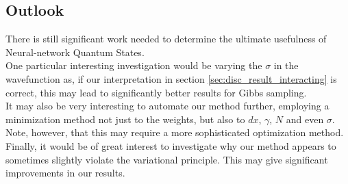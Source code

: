 \documentclass[a4paper, 10pt]{article}
\begin{document}
\subsection{Outlook}
There is still significant work needed to determine the ultimate usefulness of Neural-network Quantum States.\\
\linebreak
One particular interesting investigation would be varying the $\sigma$ in the wavefunction as, if our interpretation in section \ref{sec:disc_result_interacting} is correct, this may lead to significantly better results for Gibbs sampling.\\
\linebreak
It may also be very interesting to automate our method further, employing a minimization method not just to the weights, but also to $dx$, $\gamma$, $N$ and even $\sigma$. Note, however, that this may require a more sophisticated optimization method.\\
\linebreak
Finally, it would be of great interest to investigate why our method appears to sometimes slightly violate the variational principle. This may give significant improvements in our results.
\clearpage
\end{document}
